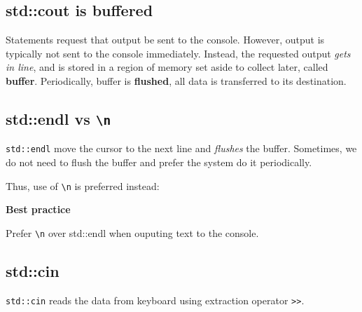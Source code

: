 \documentclass[
  letterpaper,
  DIV=11,
  numbers=noendperiod]{scrreprt}
\begin{document}
\hypertarget{stdcout-is-buffered}{%
\subsection{std::cout is buffered}\label{stdcout-is-buffered}}

Statements request that output be sent to the console. However, output
is typically not sent to the console immediately. Instead, the requested
output \emph{gets in line}, and is stored in a region of memory set
aside to collect later, called \textbf{buffer}. Periodically, buffer is
\textbf{flushed}, all data is transferred to its destination.

\hypertarget{stdendl-vs-n}{%
\subsection{\texorpdfstring{std::endl vs
\texttt{\textbackslash{}n}}{std::endl vs \textbackslash n}}\label{stdendl-vs-n}}

\texttt{std::endl} move the cursor to the next line and \emph{flushes}
the buffer. Sometimes, we do not need to flush the buffer and prefer the
system do it periodically.

Thus, use of \texttt{\textbackslash{}n} is preferred instead:

\begin{tcolorbox}[enhanced jigsaw, toprule=.15mm, rightrule=.15mm, opacityback=0, breakable, leftrule=.75mm, colback=white, colframe=quarto-callout-tip-color-frame, arc=.35mm, left=2mm, bottomrule=.15mm]
\begin{minipage}[t]{5.5mm}
\textcolor{quarto-callout-tip-color}{\faLightbulb}
\end{minipage}%
\begin{minipage}[t]{\textwidth - 5.5mm}

\textbf{Best practice}\vspace{2mm}

Prefer \texttt{\textbackslash{}n} over std::endl when ouputing text to
the console.

\end{minipage}%
\end{tcolorbox}

\hypertarget{stdcin}{%
\subsection{std::cin}\label{stdcin}}

\texttt{std::cin} reads the data from keyboard using extraction operator
\texttt{\textgreater{}\textgreater{}}.
\end{document}
